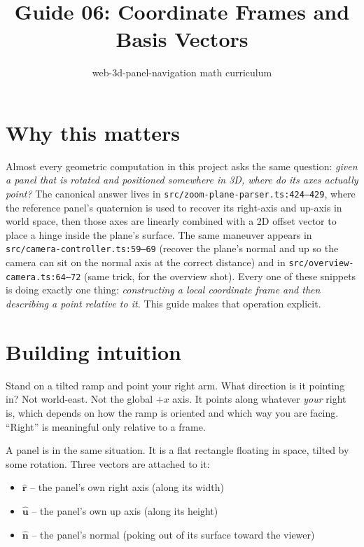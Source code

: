 \documentclass{article}
\title{Guide 06: Coordinate Frames and Basis Vectors}
\author{web-3d-panel-navigation math curriculum}
\date{}
\begin{document}
\maketitle

\section{Why this matters}

Almost every geometric computation in this project asks the same question:
\emph{given a panel that is rotated and positioned somewhere in 3D, where do
its axes actually point?} The canonical answer lives in
\texttt{src/zoom-plane-parser.ts:424--429}, where the reference panel's
quaternion is used to recover its right-axis and up-axis in world space, then
those axes are linearly combined with a 2D offset vector to place a hinge
inside the plane's surface. The same maneuver appears in
\texttt{src/camera-controller.ts:59--69} (recover the plane's normal and up so
the camera can sit on the normal axis at the correct distance) and in
\texttt{src/overview-camera.ts:64--72} (same trick, for the overview shot).
Every one of these snippets is doing exactly one thing: \emph{constructing a
local coordinate frame and then describing a point relative to it.} This
guide makes that operation explicit.

\section{Building intuition}

Stand on a tilted ramp and point your right arm. What direction is it pointing
in? Not world-east. Not the global $+x$ axis. It points along whatever
\emph{your} right is, which depends on how the ramp is oriented and which way
you are facing. ``Right'' is meaningful only relative to a frame.

A panel is in the same situation. It is a flat rectangle floating in space,
tilted by some rotation. Three vectors are attached to it:

\begin{itemize}
    \item $\hat{\mathbf{r}}$ -- the panel's own right axis (along its width)
    \item $\hat{\mathbf{u}}$ -- the panel's own up axis (along its height)
    \item $\hat{\mathbf{n}}$ -- the panel's normal (poking out of its surface
          toward the viewer)
\end{itemize}
\end{document}
